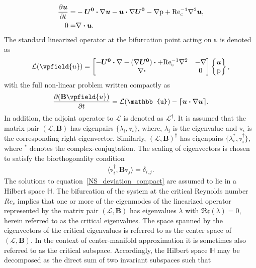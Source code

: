 \begin{equation}
	\label{NS_perturbation}
	\begin{aligned}
		\frac{\partial \boldsymbol{u}}{\partial t} =& -\boldsymbol{U^{0}}\boldsymbol{\cdot}\nabla \boldsymbol{u} - \boldsymbol{u}\boldsymbol{\cdot}\nabla\boldsymbol{U^{0}} - \nabla \mathrm{p} + \mathrm{Re_{c}^{-1}}\nabla^{2} \boldsymbol{u}, \\
		0 =& \nabla\boldsymbol{\cdot} \boldsymbol{u} .
	\end{aligned}
\end{equation}
The standard linearized operator at the bifurcation point acting on $\mathbb{u}$ is denoted as
\begin{eqnarray}
	\mathcal{L}(\vpfield{u}) =
	\begin{bmatrix}
			-\vecUb\bcdot\nabla  - (\nabla\vecUb)\bcdot + \inv{Re_{c}}\nabla^{2} & -\nabla \\
			\nabla \bcdot  													     										  & 0
	\end{bmatrix}
	\begin{Bmatrix}
		\vecu \\
		\pfield{p}
	\end{Bmatrix},
	\label{Lop}
\end{eqnarray}
with the full non-linear problem written compactly as
\begin{eqnarray}
	\label{NS_deviation_compact}
	\frac{\partial (\mathbf{B}\vpfield{u}) }{\partial t} =  \mathcal{L}(\mathbb{u}) - \blbracket \vecu\bcdot\nabla \vecu \brbracket \label{nonlinear_evolution}.
\end{eqnarray}
In addition, the adjoint operator to $\mathcal{L}$ is denoted as $\mathcal{L}^{\dagger}$. It is assumed that the matrix pair $(\mathcal{L}, \mathbf{B})$ has eigenpairs $\{\lambda_{i},\mathbb{v}_{i}\}$, where, $\lambda_{i}$ is the eigenvalue and $\mathbb{v}_{i}$ is the corresponding right eigenvector. Similarly, $(\mathcal{L},\mathbf{B})^{\dagger}$ has eigenpairs $\{\lambda^{*}_{i},\mathbb{v}^{\dagger}_{i}\}$, where $^{*}$ denotes the complex-conjugtation. The scaling of eigenvectors is chosen to satisfy the biorthogonality condition
\begin{eqnarray}
	\langle\mathbb{v}^{\dagger}_{i},\mathbf{B}\mathbb{v}_{j}\rangle = \delta_{i,j} \label{std_biorthogonality}.
\end{eqnarray}
The solutions to equation~\eqref{NS_deviation_compact} are assumed to lie in a Hilbert space $\mathds{H}$. The bifurcation of the system at the critical Reynolds number $Re_{c}$ implies that one or more of the eigenmodes of the linearized operator represented by the matrix pair $(\mathcal{L},\mathbf{B})$ has eigenvalues $\lambda$ with $\mathfrak{Re}(\lambda) = 0$, herein referred to as the critical eigenvalues. The space spanned by the eigenvectors of the critical eigenvalues is referred to as the center space of $(\mathcal{L},\mathbf{B})$. In the context of center-manifold approximation it is sometimes also referred to as the critical subspace. Accordingly, the Hilbert space $\mathds{H}$ may be decomposed as the direct sum of two invariant subspaces such that
